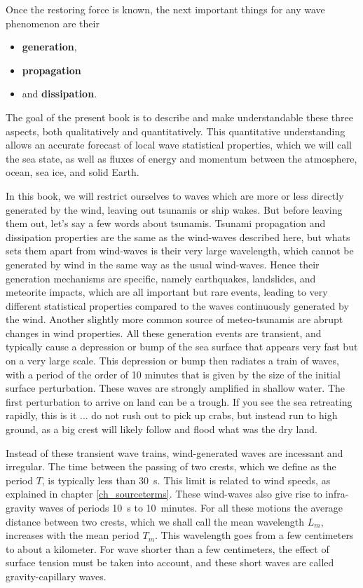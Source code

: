 Once the restoring force is known, the next important things for any wave phenomenon are their
\begin{itemize}
          \item \textbf{generation},
          \item \textbf{propagation} 
          \item and \textbf{dissipation}.
         \end{itemize}
The goal of the present book is to describe and make understandable these 
three aspects, both qualitatively and quantitatively. 
This quantitative understanding allows an accurate forecast of local wave statistical properties, which we will 
call the sea state, as well as fluxes of energy and momentum between the atmosphere, ocean, sea ice, and solid Earth. 


In this book, we will restrict ourselves to waves which are more or less directly generated by the wind, leaving out 
tsunamis or ship wakes. But before leaving them out, let's say a few words about tsunamis. Tsunami propagation and dissipation properties 
are the same as the wind-waves described here, but whats sets them apart from wind-waves is their very large wavelength, 
which cannot be generated by wind in the same way as the usual wind-waves. Hence their generation mechanisms are specific, namely earthquakes, 
landslides, and meteorite 
impacts, which are all important but rare events, leading to very different statistical properties compared to the waves continuously 
generated by the wind. Another slightly more common source of meteo-tsunamis are abrupt changes in wind properties. 
All these generation events are transient, and typically cause a depression or bump of the sea surface that appears very fast but on a very 
large scale. This depression or bump then radiates a train of waves, with a period of the order of 10 minutes that is given by the size 
of the initial surface perturbation. These waves are strongly amplified in shallow water. The first perturbation to arrive on land can be a trough. 
If you see the sea retreating rapidly, this is it ... do not rush out to pick up crabs, but instead run to high ground, as a big crest will 
likely follow and flood what was the dry land. 

Instead of these transient wave trains, wind-generated waves are incessant and irregular.
The  time between the passing of two crests, which we define as the period $T$,  is typically less than 30~s. This limit is related 
to wind speeds, as explained in chapter \ref{ch_sourceterms}. 
These wind-waves also give rise to infra-gravity waves of periods 10~s to 10~minutes. For all these motions 
the average distance between two crests, which we shall call the mean wavelength $L_m$, increases with the mean period $T_m$. 
This wavelength goes from a few centimeters to about a kilometer. For wave shorter than a few centimeters, the effect of surface 
tension must be taken into account, and these short waves are called gravity-capillary waves. 

